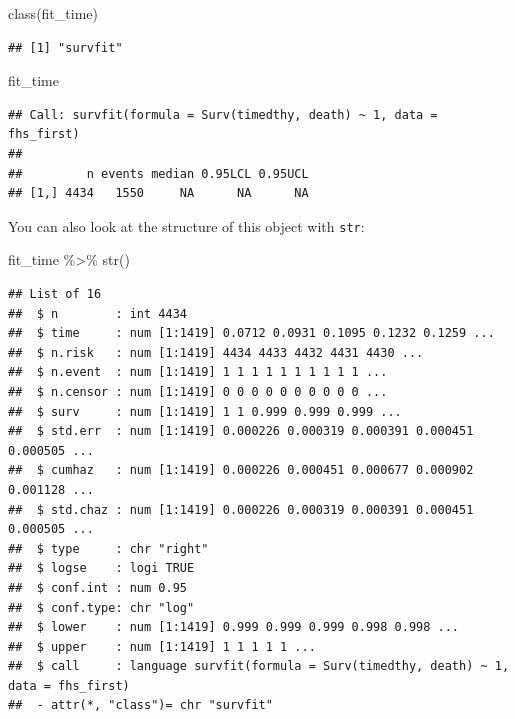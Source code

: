 \documentclass[
]{book}
\newenvironment{Shaded}{\begin{snugshade}}{\end{snugshade}}
\newcommand{\FunctionTok}[1]{\textcolor[rgb]{0.00,0.00,0.00}{#1}}
\newcommand{\NormalTok}[1]{#1}
\newcommand{\SpecialCharTok}[1]{\textcolor[rgb]{0.00,0.00,0.00}{#1}}
\begin{document}
\begin{Shaded}
\begin{Highlighting}[]
\FunctionTok{class}\NormalTok{(fit\_time)}
\end{Highlighting}
\end{Shaded}

\begin{verbatim}
## [1] "survfit"
\end{verbatim}

\begin{Shaded}
\begin{Highlighting}[]
\NormalTok{fit\_time}
\end{Highlighting}
\end{Shaded}

\begin{verbatim}
## Call: survfit(formula = Surv(timedthy, death) ~ 1, data = fhs_first)
## 
##         n events median 0.95LCL 0.95UCL
## [1,] 4434   1550     NA      NA      NA
\end{verbatim}

You can also look at the structure of this object with \texttt{str}:

\begin{Shaded}
\begin{Highlighting}[]
\NormalTok{fit\_time }\SpecialCharTok{\%\textgreater{}\%} 
  \FunctionTok{str}\NormalTok{() }
\end{Highlighting}
\end{Shaded}

\begin{verbatim}
## List of 16
##  $ n        : int 4434
##  $ time     : num [1:1419] 0.0712 0.0931 0.1095 0.1232 0.1259 ...
##  $ n.risk   : num [1:1419] 4434 4433 4432 4431 4430 ...
##  $ n.event  : num [1:1419] 1 1 1 1 1 1 1 1 1 1 ...
##  $ n.censor : num [1:1419] 0 0 0 0 0 0 0 0 0 0 ...
##  $ surv     : num [1:1419] 1 1 0.999 0.999 0.999 ...
##  $ std.err  : num [1:1419] 0.000226 0.000319 0.000391 0.000451 0.000505 ...
##  $ cumhaz   : num [1:1419] 0.000226 0.000451 0.000677 0.000902 0.001128 ...
##  $ std.chaz : num [1:1419] 0.000226 0.000319 0.000391 0.000451 0.000505 ...
##  $ type     : chr "right"
##  $ logse    : logi TRUE
##  $ conf.int : num 0.95
##  $ conf.type: chr "log"
##  $ lower    : num [1:1419] 0.999 0.999 0.999 0.998 0.998 ...
##  $ upper    : num [1:1419] 1 1 1 1 1 ...
##  $ call     : language survfit(formula = Surv(timedthy, death) ~ 1, data = fhs_first)
##  - attr(*, "class")= chr "survfit"
\end{verbatim}
\end{document}
